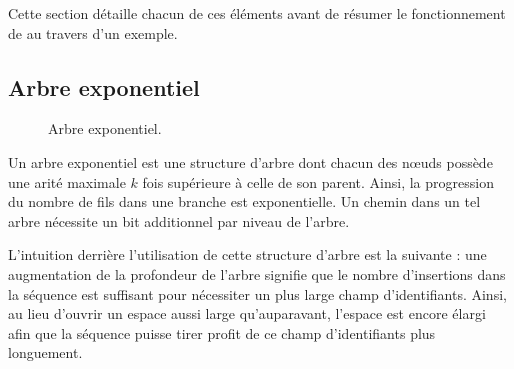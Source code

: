 
Cette section détaille chacun de ces éléments avant de résumer le fonctionnement
de \LSEQ au travers d'un exemple.







\subsection{Arbre exponentiel}
\label{repl:subsec:exponentialtree}

\begin{figure}
  \begin{center}
    
    \caption[Arbre exponentiel]
    {\label{repl:fig:exponentialtree}Arbre exponentiel.}
  \end{center}
\end{figure}


Un arbre exponentiel est une structure d'arbre dont chacun des nœuds possède une
arité maximale $k$ fois supérieure à celle de son parent. Ainsi, la progression
du nombre de fils dans une branche est exponentielle. Un chemin dans un tel
arbre nécessite un bit additionnel par niveau de l'arbre.

L'intuition derrière l'utilisation de cette structure d'arbre est la suivante :
une augmentation de la profondeur de l'arbre signifie que le nombre d'insertions
dans la séquence est suffisant pour nécessiter un plus large champ
d'identifiants. Ainsi, au lieu d'ouvrir un espace aussi large qu'auparavant,
l'espace est encore élargi afin que la séquence puisse tirer profit de ce champ
d'identifiants plus longuement.


